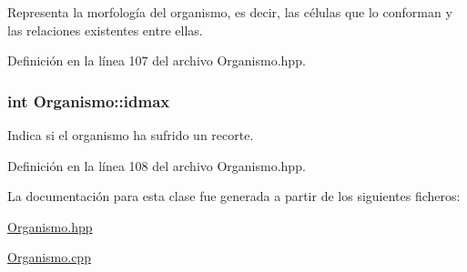 Representa la morfología del organismo, es decir, las células que lo conforman y las relaciones existentes entre ellas. 



Definición en la línea 107 del archivo Organismo.\-hpp.

\hypertarget{class_organismo_ae64c038f5e9a19d5c7d858a2b0fb58ee}{
\subsubsection[{idmax}]{\setlength{\rightskip}{0pt plus 5cm}int Organismo\-::idmax\hspace{0.3cm}{\ttfamily [private]}}}\label{class_organismo_ae64c038f5e9a19d5c7d858a2b0fb58ee}


Indica si el organismo ha sufrido un recorte. 



Definición en la línea 108 del archivo Organismo.\-hpp.



La documentación para esta clase fue generada a partir de los siguientes ficheros\-:\begin{DoxyCompactItemize}
\item 
\hyperlink{_organismo_8hpp}{Organismo.\-hpp}\item 
\hyperlink{_organismo_8cpp}{Organismo.\-cpp}\end{DoxyCompactItemize}
